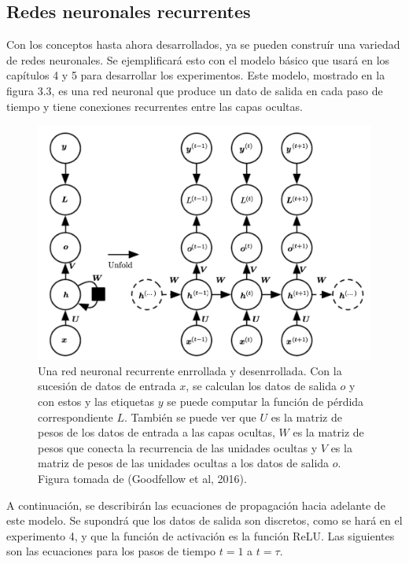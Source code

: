 \subsection{Redes neuronales recurrentes}
Con los conceptos hasta ahora desarrollados, ya se pueden construír una variedad de redes neuronales. Se ejemplificará esto con el modelo básico que usará en los capítulos 4 y 5 para desarrollar los experimentos. Este modelo, mostrado en la figura 3.3, es una red neuronal que produce un dato de salida en cada paso de tiempo y tiene conexiones recurrentes entre las capas ocultas.
\cite{goodfellow-et-al-2016}
\cite{DBLP:journals/corr/Graves13}

\begin{figure}[h]
\begin{center}
\includegraphics[width=150mm, scale = 0.8]{./imag/unfold3.png}
\end{center}
\caption{Una red neuronal recurrente enrrollada y desenrrollada. Con la sucesión de datos de entrada $x$, se calculan los datos de salida $o$ y con estos y las etiquetas $y$ se puede computar la función de pérdida correspondiente $L$. También se puede ver que $U$ es la matriz de pesos de los datos de entrada a las capas ocultas, $W$ es la matriz de pesos que conecta la recurrencia de las unidades ocultas y $V$ es la matriz de pesos de las unidades ocultas a los datos de salida $o$. Figura tomada de (Goodfellow et al, 2016).}
\end{figure}

\vspace{1em}

A continuación, se describirán las ecuaciones de propagación hacia adelante de este modelo. Se supondrá que los datos de salida son discretos, como se hará en el experimento 4, y que la función de activación es la función ReLU. Las siguientes son las ecuaciones para los pasos de tiempo $t=1$ a $t=\tau$.


